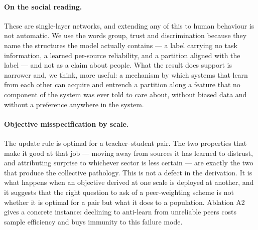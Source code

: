 \paragraph{On the social reading.} These are single-layer networks, and extending
any of this to human behaviour is not automatic. We use the words group, trust and
discrimination because they name the structures the model actually contains --- a
label carrying no task information, a learned per-source reliability, and a
partition aligned with the label --- and not as a claim about people. What the
result does support is narrower and, we think, more useful: a mechanism by which
systems that learn from each other can acquire and entrench a partition along a
feature that no component of the system was ever told to care about, without
biased data and without a preference anywhere in the system.

\paragraph{Objective misspecification by scale.} The update rule is optimal for a
teacher--student pair. The two properties that make it good at that job --- moving
away from sources it has learned to distrust, and attributing surprise to whichever
sector is less certain --- are exactly the two that produce the collective
pathology. This is not a defect in the derivation. It is what happens when an
objective derived at one scale is deployed at another, and it suggests that the
right question to ask of a peer-weighting scheme is not whether it is optimal for a
pair but what it does to a population. Ablation A2 gives a concrete instance:
declining to anti-learn from unreliable peers costs sample efficiency and buys
immunity to this failure mode.
